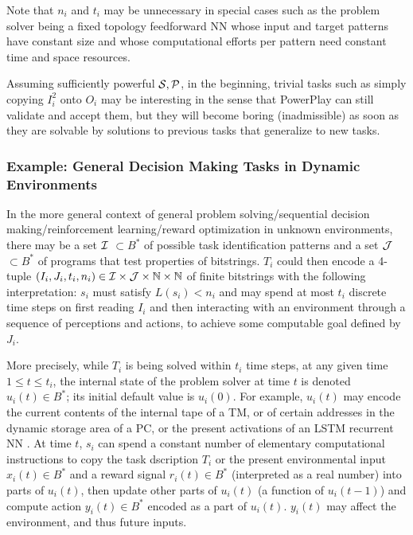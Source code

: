 \documentclass{article}
\begin{document}
Note that $n_i$ and $t_i$ may be unnecessary in 
special cases such as the problem solver being a fixed topology feedforward
NN \cite{bishop:2006} 
whose input and target patterns have constant size and whose
computational efforts per pattern need constant time and space resources.

Assuming  sufficiently powerful  $\cal S, \cal P$,
in the beginning,
trivial tasks such as simply copying $I^2_i$ onto $O_i$ may be interesting 
in the sense that {\sc PowerPlay} can still validate and accept them,
but they will become boring (inadmissible) 
as soon as they are solvable by solutions to previous tasks that generalize
to new tasks.

\subsubsection{Example: General Decision Making Tasks in Dynamic Environments} 
\label{decisionmaking}

In the more general context of general problem solving/sequential decision making/reinforcement learning/reward optimization \cite{Newell:63,Kaelbling:96,suba98} in unknown environments, 
there may be a set $\cal I$ $\subset B^*$ of possible task identification patterns and
a set $\cal J$ $ \subset B^*$ of programs that test properties of bitstrings.
$T_i$ could then encode a 4-tuple $(I_i, J_i, t_i, n_i)\in \cal I \times \cal J \times \mathbb{N} \times \mathbb{N}$ of finite bitstrings
with the following interpretation:
$s_i$ must satisfy $L(s_i)< n_i$ and may spend at most $t_i$ discrete time steps  on first reading $I_i$ 
and then interacting with an environment through a sequence of perceptions and actions,
to achieve some computable goal defined by $J_i$.

More precisely, while $T_i$ is being solved within $t_i$ time steps,
at any given time $1 \leq t \leq t_i$,
the internal state of the problem solver at time $t$ is denoted $u_i(t) \in B^*$; its initial default value is $u_i(0)$.
For example, $u_i(t)$ may encode the current contents of the internal tape of a TM, 
or of certain addresses in the dynamic storage area of a PC,
or the present activations of an LSTM recurrent NN \cite{Hochreiter:97lstm}.
At time $t$, $s_i$ can spend a constant number of elementary computational instructions to copy
the task dscription $T_i$ or 
the present environmental input $x_i(t) \in B^*$ and a reward signal $r_i(t) \in B^*$ (interpreted
as a real number)
into parts of $u_i(t)$, then update 
other parts of $u_i(t)$ (a function of 
$u_i(t-1)$) and compute
action $y_i(t) \in B^*$ encoded as a part of $u_i(t)$. $y_i(t)$ may affect the environment, and thus future inputs. 
\end{document}
